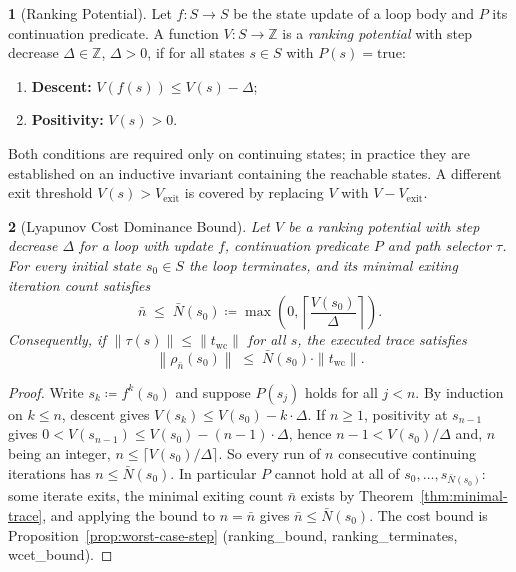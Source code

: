 \documentclass[oneside,english]{amsart}
\numberwithin{equation}{section}
\numberwithin{figure}{section}
\theoremstyle{plain}
\newtheorem{thm}{\protect\theoremname}
\theoremstyle{definition}
\newtheorem{defn}[thm]{\protect\definitionname}
\theoremstyle{plain}
\theoremstyle{remark}
\theoremstyle{plain}
\theoremstyle{definition}
\theoremstyle{plain}
\theoremstyle{remark}
\newcommand{\lean}[1]{{\ttfamily\small #1}}
\providecommand{\definitionname}{Definition}
\providecommand{\theoremname}{Theorem}
\begin{document}
\begin{defn}[Ranking Potential]\label{def:ranking-potential}
Let $f : S \to S$ be the state update of a loop body and $P$ its continuation predicate. A function $V : S \to \mathbb{Z}$ is a \textit{ranking potential} with step decrease $\Delta \in \mathbb{Z}$, $\Delta > 0$, if for all states $s \in S$ with $P(s) = \text{true}$:
\begin{enumerate}
    \item \textbf{Descent:} $V\left(f(s)\right) \le V(s) - \Delta$;
    \item \textbf{Positivity:} $V(s) > 0$.
\end{enumerate}
\end{defn}

Both conditions are required only on continuing states; in practice they are established on an inductive invariant containing the reachable states. A different exit threshold $V(s) > V_{\text{exit}}$ is covered by replacing $V$ with $V - V_{\text{exit}}$.

\begin{thm}[Lyapunov Cost Dominance Bound]\label{thm:lyapunov-bound}
Let $V$ be a ranking potential with step decrease $\Delta$ for a loop with update $f$, continuation predicate $P$ and path selector $\tau$. For every initial state $s_0 \in S$ the loop terminates, and its minimal exiting iteration count satisfies
\[
\bar{n} \;\le\; \bar{N}(s_0) \coloneqq \max\left(0, \left\lceil \frac{V(s_0)}{\Delta} \right\rceil\right).
\]
Consequently, if $\|\tau(s)\| \le \|t_{\text{wc}}\|$ for all $s$, the executed trace satisfies
\[
\left\|\rho_{\bar{n}}(s_0)\right\| \;\le\; \bar{N}(s_0) \cdot \|t_{\text{wc}}\|.
\]
\end{thm}

\begin{proof}
Write $s_k \coloneqq f^k(s_0)$ and suppose $P(s_j)$ holds for all $j < n$. By induction on $k \le n$, descent gives $V(s_k) \le V(s_0) - k \cdot \Delta$. If $n \ge 1$, positivity at $s_{n-1}$ gives $0 < V(s_{n-1}) \le V(s_0) - (n-1) \cdot \Delta$, hence $n - 1 < V(s_0)/\Delta$ and, $n$ being an integer, $n \le \lceil V(s_0)/\Delta \rceil$. So every run of $n$ consecutive continuing iterations has $n \le \bar{N}(s_0)$. In particular $P$ cannot hold at all of $s_0, \dots, s_{\bar{N}(s_0)}$: some iterate exits, the minimal exiting count $\bar{n}$ exists by Theorem~\ref{thm:minimal-trace}, and applying the bound to $n = \bar{n}$ gives $\bar{n} \le \bar{N}(s_0)$. The cost bound is Proposition~\ref{prop:worst-case-step} (\lean{ranking\_\allowbreak bound}, \lean{ranking\_\allowbreak terminates}, \lean{wcet\_\allowbreak bound}).
\end{proof}
\end{document}
